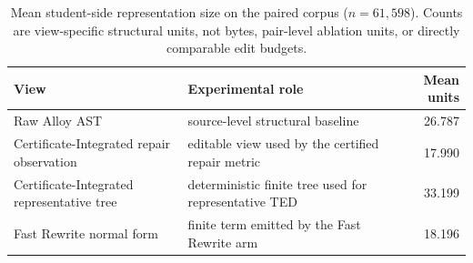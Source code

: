 \begin{table}[H]
\centering
\caption{Mean student-side representation size on the paired corpus
($n=61{,}598$). Counts are view-specific structural units, not bytes,
pair-level ablation units, or directly comparable edit budgets.}
\label{tab:compact}
\small
\begin{tabular}{@{}p{3.1cm}p{5.5cm}r@{}}
\toprule
View & Experimental role & Mean units\\
\midrule
Raw Alloy AST & source-level structural baseline & 26.787\\
Certificate-Integrated repair observation & editable view used by the certified repair metric & 17.990\\
Certificate-Integrated representative tree & deterministic finite tree used for representative TED & 33.199\\
Fast Rewrite normal form & finite term emitted by the Fast Rewrite arm & 18.196\\
\bottomrule
\end{tabular}
\end{table}
